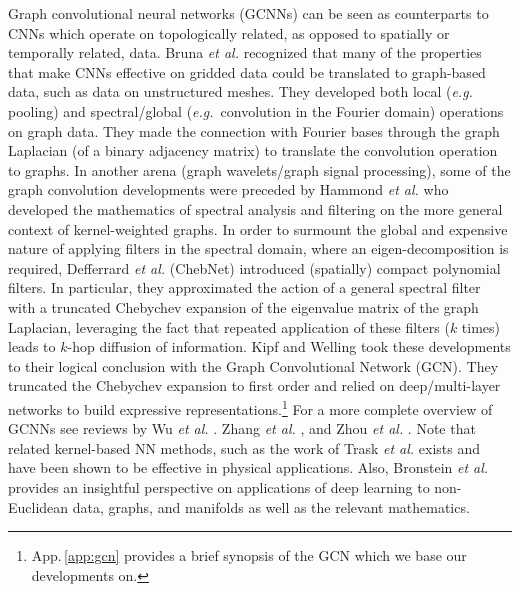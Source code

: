 \documentclass[12pt,reqno]{article}
\newcommand{\aref}[1]{App.\,\ref{#1}}
\newcommand{\eg}{{\it e.g.}\!\, }
\newcommand{\etal}{{\it et al.} }
\begin{document}
Graph convolutional neural networks (GCNNs) \cite{bruna2013spectral,bronstein2017geometric} can be seen as counterparts to CNNs which operate on topologically related, as opposed to spatially or temporally related, data.
Bruna \etal \cite{bruna2013spectral} recognized that many of the properties that make CNNs effective on gridded data could be translated to graph-based data, such as data on unstructured meshes.
They developed both local (\eg pooling) and spectral/global (\eg convolution in the Fourier domain) operations on graph data.
They made the connection with Fourier bases through the graph Laplacian (of a binary adjacency matrix) to translate the convolution operation to graphs.
In another arena (graph wavelets/graph signal processing), some of the graph convolution developments were preceded by Hammond \etal \cite{hammond2011wavelets} who developed the mathematics of spectral analysis and filtering on the more general context of kernel-weighted graphs.
In order to surmount the global and expensive nature of applying filters in the spectral domain, where an eigen-decomposition is required, Defferrard \etal \cite{defferrard2016convolutional} (ChebNet) introduced (spatially) compact polynomial filters.
In particular, they approximated the action of a general spectral filter with a truncated  Chebychev expansion of the eigenvalue matrix of the graph Laplacian,
leveraging the fact that repeated application of these filters ($k$ times) leads to $k$-hop diffusion of information.
Kipf and Welling \cite{kipf2016semi} took these developments to their logical conclusion with the Graph Convolutional Network (GCN).
They truncated the Chebychev expansion to first order and relied on deep/multi-layer networks to build expressive representations.\footnote{\aref{app:gcn} provides a brief synopsis of the GCN which we base our developments on.}
For a more complete overview of GCNNs see reviews by Wu \etal \cite{wu2020comprehensive}. Zhang \etal \cite{zhang2020deep}, and  Zhou \etal \cite{zhou2020graph}.
Note that related kernel-based NN methods, such as the work of Trask \etal \cite{trask2019gmls,trask2020enforcing} exists and have been shown to be effective in physical applications.
Also, Bronstein \etal \cite{bronstein2017geometric} provides an insightful perspective on applications of deep learning to non-Euclidean data, graphs, and manifolds as well as the relevant mathematics.
\end{document}
